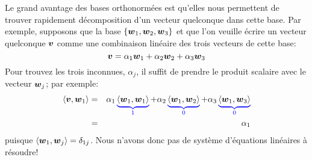 Le grand avantage des bases orthonormées est qu'elles nous permettent de trouver rapidement
décomposition d'un vecteur quelconque dans cette base.  Par exemple, supposons que
la base $\{\boldsymbol{w}_1, \boldsymbol{w}_2, \boldsymbol{w}_3\}$  et que l'on veuille écrire un vecteur
quelconque $\boldsymbol{v}$ comme une combinaison linéaire des trois vecteurs de cette base:
\[
\boldsymbol{v} = \alpha_1\boldsymbol{w}_1 + \alpha_2\boldsymbol{w}_2 + \alpha_3\boldsymbol{w}_3
\]
Pour trouvez les trois inconnues, $\alpha_j$, il suffit de prendre le produit scalaire
avec le vecteur $\boldsymbol{w}_j$; par exemple:
\begin{eqnarray*}
\langle \boldsymbol{v}, \boldsymbol{w}_1\rangle &=&
 \alpha_1\color{blue}
 \underbrace{\color{black}\langle\boldsymbol{w}_1, \boldsymbol{w}_1\rangle}_1\color{black} +
 \alpha_2\color{blue}\underbrace{\color{black}\langle\boldsymbol{w}_1, \boldsymbol{w}_2\rangle}_0
  \color{black}+ \alpha_3\color{blue}\underbrace{\color{black}\langle\boldsymbol{w}_1,
   \boldsymbol{w}_3\rangle}_0 \\
 &=& \alpha_1
\end{eqnarray*}
 puisque $\langle\boldsymbol{w}_1, \boldsymbol{w}_j\rangle = \delta_{1j}$.  Nous n'avons donc pas 
 de système d'équations linéaires à résoudre!

